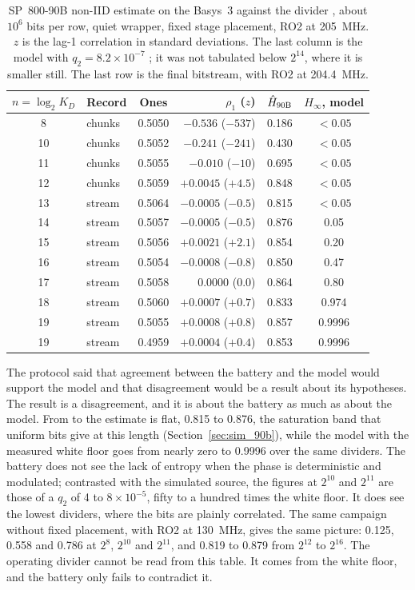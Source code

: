 \begin{table}[htbp]
\centering
\caption{SP~800-90B non-IID estimate on the Basys~3 against the divider
\meas{}, about $10^6$ bits per row, quiet wrapper, fixed stage placement,
RO2 at 205~MHz. $z$ is the lag-1 correlation in standard deviations. The
last column is the model with $q_2 = 8.2\times10^{-7}$ \est{}; it was not
tabulated below $2^{14}$, where it is smaller still. The last row is the
final bitstream, with RO2 at 204.4~MHz.}
\label{tab:fpga_90b}
\small
\begin{tabular}{@{}clcrcc@{}}
\toprule
$n = \log_2 K_D$ & Record & Ones & $\rho_1$ ($z$) & $\hat{H}_{\mathrm{90B}}$ & $H_\infty$, model \\
\midrule
8  & chunks & 0.5050 & $-0.536$ ($-537$)   & 0.186 & $<0.05$ \\
10 & chunks & 0.5052 & $-0.241$ ($-241$)   & 0.430 & $<0.05$ \\
11 & chunks & 0.5055 & $-0.010$ ($-10$)    & 0.695 & $<0.05$ \\
12 & chunks & 0.5059 & $+0.0045$ ($+4.5$)  & 0.848 & $<0.05$ \\
13 & stream & 0.5064 & $-0.0005$ ($-0.5$)  & 0.815 & $<0.05$ \\
14 & stream & 0.5057 & $-0.0005$ ($-0.5$)  & 0.876 & 0.05 \\
15 & stream & 0.5056 & $+0.0021$ ($+2.1$)  & 0.854 & 0.20 \\
16 & stream & 0.5054 & $-0.0008$ ($-0.8$)  & 0.850 & 0.47 \\
17 & stream & 0.5058 & $0.0000$ ($0.0$)    & 0.864 & 0.80 \\
18 & stream & 0.5060 & $+0.0007$ ($+0.7$)  & 0.833 & 0.974 \\
19 & stream & 0.5055 & $+0.0008$ ($+0.8$)  & 0.857 & 0.9996 \\
\midrule
19 & stream & 0.4959 & $+0.0004$ ($+0.4$)  & 0.853 & 0.9996 \\
\bottomrule
\end{tabular}
\end{table}

The protocol said that agreement between the battery and the model would
support the model and that disagreement would be a result about its
hypotheses. The result is a disagreement, and it is about the battery as
much as about the model. From  to  the estimate is flat,
0.815 to 0.876, the saturation band that uniform bits give at this
length (Section~\ref{sec:sim_90b}), while the model with the measured
white floor goes from nearly zero to 0.9996 over the same dividers. The
battery does not see the lack of entropy when the phase is deterministic
and modulated; contrasted with the simulated source, the figures at
$2^{10}$ and $2^{11}$ are those of a $q_2$ of 4 to $8\times10^{-5}$,
fifty to a hundred times the white floor. It does see the lowest
dividers, where the bits are plainly correlated. The same campaign
without fixed placement, with RO2 at 130~MHz, gives the same picture:
0.125, 0.558 and 0.786 at $2^{8}$, $2^{10}$ and $2^{11}$, and 0.819 to
0.879 from $2^{12}$ to $2^{16}$. The operating divider cannot be read
from this table. It comes from the white floor, and the battery only
fails to contradict it.

